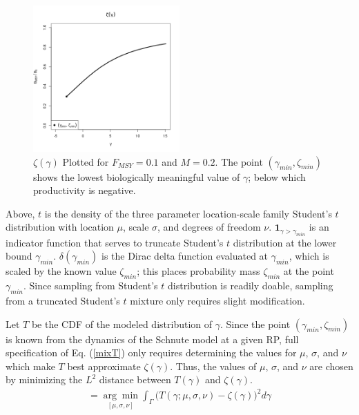 \documentclass[12pt]{article}
\begin{document}
%

%
\begin{figure}
\vspace*{-1cm}
\includegraphics[width=0.5\textwidth]{../gpBias/zeta.png}
\vspace*{-1.3cm}
\caption{$\zeta(\gamma)$ Plotted for $F_{MSY}=0.1$ and $M=0.2$. The point 
$(\gamma_{min}, \zeta_{min})$ shows the lowest biologically meaningful 
value of $\gamma$; below which productivity is negative.}
\end{figure}
 
%
Above, $t$ is the density of the three parameter location-scale family Student's $t$ 
distribution with location $\mu$, scale $\sigma$, and degrees of freedom $\nu$. 
$\bm{1}_{\gamma>\gamma_{min}}$ is an indicator function that serves to truncate 
Student's $t$ distribution at the lower bound $\gamma_{min}$. 
$\delta(\gamma_{min})$ is the Dirac delta function evaluated at $\gamma_{min}$, 
which is scaled by the known value $\zeta_{min}$; this places probability mass 
$\zeta_{min}$ at the point $\gamma_{min}$. Since sampling from Student's $t$ 
distribution is readily doable, sampling from a truncated Student's $t$ mixture 
only requires slight modification. 

Let $T$ be the CDF of the modeled distribution of $\gamma$. Since the point 
$(\gamma_{min}, \zeta_{min})$ is known from the dynamics of the Schnute model 
at a given RP, full specification of Eq. (\ref{mixT}) only requires determining 
the values for $\mu$, $\sigma$, and $\nu$ which make $T$ best approximate 
$\zeta(\gamma)$. Thus, the values of $\mu$, $\sigma$, and $\nu$ are chosen by 
minimizing the $L^2$ distance between $T(\gamma)$ and $\zeta(\gamma)$.
\begin{align}
[\hat\mu, \hat\sigma, \hat\nu]=\underset{{[\mu, \sigma, \nu]}}{\arg\min}\int_\Gamma \big(T(\gamma; \mu, \sigma, \nu) - \zeta(\gamma)\big)^2 d\gamma
\end{align}  
\end{document}
